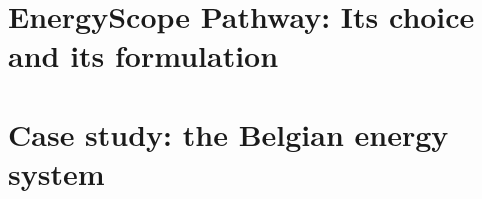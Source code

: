 \documentclass[a4paper,twoside,10pt,final]{memoir} %
\begin{document}







\begin{appendices}

\chapter{EnergyScope Pathway: Its choice and its formulation}
\label{app:EnergyScope}


\chapter{Case study: the Belgian energy system}
\label{app:case_study}




\end{appendices}
\end{document}
